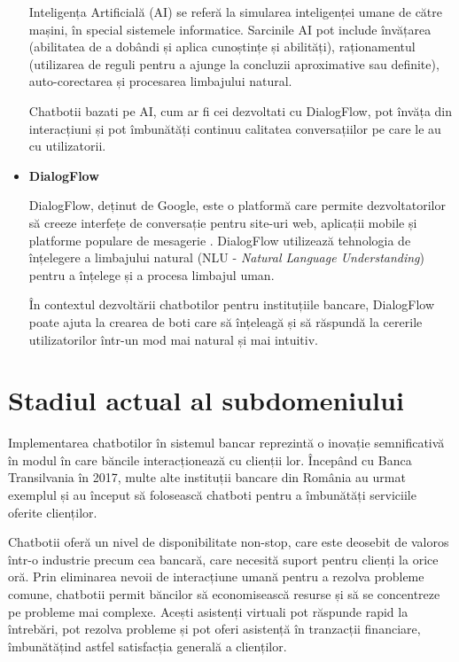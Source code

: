 \begin{itemize}
Inteligența Artificială (AI) se referă la simularea inteligenței umane de către mașini, în special sistemele informatice. Sarcinile AI pot include învățarea (abilitatea de a dobândi și aplica cunoștințe și abilități), raționamentul (utilizarea de reguli pentru a ajunge la concluzii aproximative sau definite), auto-corectarea și procesarea limbajului natural.

Chatbotii bazati pe AI, cum ar fi cei dezvoltati cu DialogFlow, pot învăța din interacțiuni și pot îmbunătăți continuu calitatea conversațiilor pe care le au cu utilizatorii.

    \item \textbf{DialogFlow}

DialogFlow, deținut de Google, este o platformă care permite dezvoltatorilor să creeze interfețe de conversație pentru site-uri web, aplicații mobile și platforme populare de mesagerie \cite{sharma2018}. DialogFlow utilizează tehnologia de înțelegere a limbajului natural (NLU - \emph{Natural Language Understanding}) pentru a înțelege și a procesa limbajul uman.

În contextul dezvoltării chatbotilor pentru instituțiile bancare, DialogFlow poate ajuta la crearea de boti care să înțeleagă și să răspundă la cererile utilizatorilor într-un mod mai natural și mai intuitiv.

\end{itemize}

\section{Stadiul actual al subdomeniului}

Implementarea chatbotilor în sistemul bancar reprezintă o inovație semnificativă în modul în care băncile interacționează cu clienții lor. Începând cu Banca Transilvania în 2017, multe alte instituții bancare din România au urmat exemplul și au început să folosească chatboti pentru a îmbunătăți serviciile oferite clienților.

Chatbotii oferă un nivel de disponibilitate non-stop, care este deosebit de valoros într-o industrie precum cea bancară, care necesită suport pentru clienți la orice oră. Prin eliminarea nevoii de interacțiune umană pentru a rezolva probleme comune, chatbotii permit băncilor să economisească resurse și să se concentreze pe probleme mai complexe. Acești asistenți virtuali pot răspunde rapid la întrebări, pot rezolva probleme și pot oferi asistență în tranzacții financiare, îmbunătățind astfel satisfacția generală a clienților.

